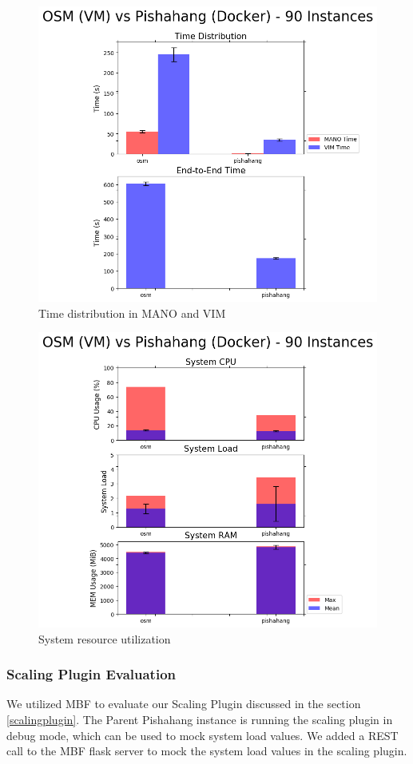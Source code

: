 \begin{figure}[h]
	\centering
	\includegraphics[width=0.7\linewidth]{figures/scalability_graphs/Comparison-VM-Docker/Time_comparison}
	\caption{Time distribution in MANO and VIM}
	\label{fig:timecomparison}
\end{figure}


\begin{figure}[h]
	\centering
	\includegraphics[width=0.7\linewidth]{figures/scalability_graphs/Comparison-VM-Docker/System_metrics_comparison}
	\caption{System resource utilization}
	\label{fig:systemmetricscomparison}
\end{figure}

\pagebreak

\subsubsection{Scaling Plugin Evaluation}

We utilized MBF to evaluate our Scaling Plugin discussed in the section \ref{scalingplugin}. 
The Parent Pishahang instance is running the scaling plugin in debug mode, which can be used to mock system load values. 
We added a REST call to the MBF flask server to mock the system load values in the scaling plugin.\\

